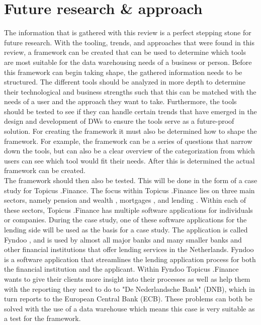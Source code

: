 \documentclass[11pt]{article}
\begin{document}
\section{Future research \& approach}
\label{approach}
The information that is gathered with this review is a perfect stepping stone for future research. With the tooling, trends, and approaches that were found in this review, a framework can be created that can be used to determine which tools are most suitable for the data warehousing needs of a business or person. Before this framework can begin taking shape, the gathered information needs to be structured. The different tools should be analyzed in more depth to determine their technological and business strengths such that this can be matched with the needs of a user and the approach they want to take. Furthermore, the tools should be tested to see if they can handle certain trends that have emerged in the design and development of DWs to ensure the tools serve as a future-proof solution. For creating the framework it must also be determined how to shape the framework. For example, the framework can be a series of questions that narrow down the tools, but can also be a clear overview of the categorization from which users can see which tool would fit their needs. After this is determined the actual framework can be created. \\

The framework should then also be tested. This will be done in the form of a case study for Topicus .Finance. The focus within Topicus .Finance lies on three main sectors, namely pension and wealth \cite{pension},  mortgages \cite{mortgages}, and lending \cite{businesslending}. Within each of these sectors, Topicus .Finance has multiple software applications for individuals or companies. During the case study, one of these software applications for the lending side will be used as the basis for a case study. The application is called Fyndoo \cite{fyndoo}, and is used by almost all major banks and many smaller banks and other financial institutions that offer lending services in the Netherlands. Fyndoo is a software application that streamlines the lending application process for both the financial institution and the applicant. Within Fyndoo Topicus .Finance wants to give their clients more insight into their processes as well as help them with the reporting they need to do to "De Nederlandsche Bank" (DNB), which in turn reports to the European Central Bank (ECB). These problems can both be solved with the use of a data warehouse which means this case is very suitable as a test for the framework. \\
\end{document}
